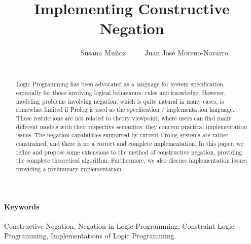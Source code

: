 \documentclass{llncs}
\begin{document}

\title{Implementing Constructive Negation}

\author{~~~~~~~~~~~~ Susana Mu\~{n}oz ~~~~ Juan Jos\'{e} Moreno-Navarro \\
 ~~~~~ }


\maketitle


%



\begin{abstract}
  Logic Programming has been advocated as a language for system
  specification, especially for those involving logical behaviours,
  rules and knowledge. However, modeling problems involving negation,
  which is quite natural in many cases, is somewhat limited if
  Prolog is used as the specification / implementation language. These
  restrictions are not related to theory viewpoint, where users can
  find many different models with their respective semantics; they
  concern practical implementation issues.  The negation capabilities
  supported by current Prolog systems are rather constrained, and there is
  no a correct and complete implementation.  In this paper, we refine
  and propose some extensions to the method of constructive negation,
  providing the complete theoretical algorithm. Furthermore, we also
  discuss implementation issues providing a preliminary
  implementation.
\end{abstract}

\paragraph{\bf Keywords}
Constructive Negation, Negation in Logic Programming, Constraint Logic
Programming, Implementations of Logic Programming.
\end{document}

